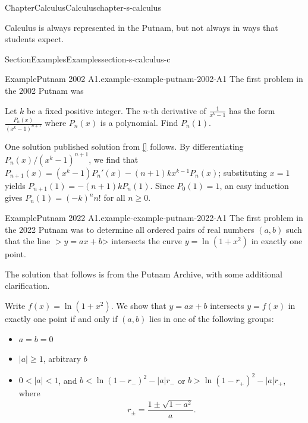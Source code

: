 \documentclass[oneside,10pt,]{book}
\newcommand{\xreffont}{\relax}
\numberwithin{equation}{section}
\newcommand{\lt}{<}
\newcommand{\gt}{>}
\begin{document}
\begin{chapterptx}{Chapter}{Calculus}{}{Calculus}{}{}{chapter-s-calculus}
\renewcommand*{\chaptername}{Chapter}
\begin{introduction}{}%
Calculus is always represented in the Putnam, but not always in ways that students expect.%
\end{introduction}%
%
%
\typeout{************************************************}
\typeout{************************************************}
%
\begin{sectionptx}{Section}{Examples}{}{Examples}{}{}{section-s-calculus-c}
\begin{example}{Example}{Putnam 2002 A1.}{example-example-putnam-2002-A1}%
The first problem in the 2002 Putnam was%
\par
Let \(k\) be a fixed positive integer. The \(n\)-th derivative of \(\frac{1}{x^k - 1}\) has the form \(\frac{P_n(x)}{(x^k - 1)^{n+1}}\) where \(P_n(x)\) is a polynomial. Find \(P_n(1)\).%
\par
One solution published solution from \hyperlink{biblio-biblio-putnam-archive}{[{\xreffont 10}]} follows.  By differentiating \(P_n(x)/(x^k-1)^{n+1}\), we find that \(P_{n+1}(x) = (x^k-1)P_n'(x)-(n+1)kx^{k-1}P_n(x)\); substituting \(x=1\) yields \(P_{n+1}(1) = -(n+1)k P_n(1)\).  Since \(P_0(1)=1\), an easy induction gives \(P_n(1) = (-k)^n n!\) for all \(n \geq 0\).%
\end{example}
\begin{example}{Example}{Putnam 2022 A1.}{example-example-putnam-2022-A1}%
The first problem in the 2022 Putnam was to determine all ordered pairs of real numbers \((a,b)\) such that the line \(>y = ax+b\)\textgreater{} intersects the curve \(y = \ln(1+x^2)\) in exactly one point.%
\par
The solution that follows is from the Putnam Archive, with some additional clarification.%
\par
Write \(f(x) = \ln(1+x^2)\). We show that \(y=ax+b\) intersects \(y=f(x)\) in exactly one point if and only if \((a,b)\) lies in one of the following groups:%
\begin{itemize}[label=\textbullet]
\item{}\(\displaystyle a=b=0\)%
\item{}\(|a| \geq 1\), arbitrary \(b\)%
\item{}\(0 \lt |a| \lt 1\), and \(b \lt \ln(1-r_-)^2-|a|r_-\) or \(b \gt \ln(1-r_+)^2-|a|r_+\), where%
\begin{equation*}
r_{\pm} = \frac{1 \pm \sqrt{1-a^2}}{a}.

\end{equation*}
\end{itemize}
\end{example}
\end{sectionptx}
\end{chapterptx}
\end{document}
